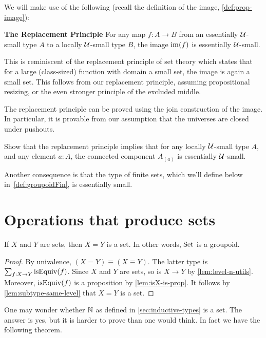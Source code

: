We will make use of the following (recall the definition of the image, \cref{def:prop-image}):
\begin{principle}[Replacement]
  \label{pri:replacement}
  {\bf The Replacement Principle} 
  For any map $f : A \to B$
  from an essentially ${\mathcal{U}}$-small type $A$
  to a locally ${\mathcal{U}}$-small type $B$,
  the image $\im(f)$ is essentially ${\mathcal{U}}$-small.
\end{principle}
This is reminiscent of the replacement principle of set theory which states
that for a large (class-sized) function with domain a small set,
the image is again a small set.
This follows from our replacement principle,
assuming propositional resizing, or the even stronger principle of the excluded middle.

The replacement principle can be proved using the join construction of the image\cite{Rijke-Join}.
In particular, it is provable from our assumption that the universes
are closed under pushouts.
\begin{xca}\label{xca:comp-loc-small-ess-small}
  Show that the replacement principle implies that for any locally ${\mathcal{U}}$-small type $A$,
  and any element $a:A$,
  the connected component $A_{(a)}$ is essentially ${\mathcal{U}}$-small.
\end{xca}
Another consequence is that the type of finite sets, which we'll define below
in~\cref{def:groupoidFin}, is essentially small.

\section{Operations that produce sets}
\label{sec:operations-on-sets}

\begin{lemma}\label{lem:Set-is-groupoid}
If $X$ and $Y$ are sets, then $X=Y$ is a set. 
In other words, $\mathrm{Set}$ is a groupoid.
\end{lemma}

\begin{proof}
By univalence, $(X=Y) \equiv (X\equiv Y)$. The latter type is
$\sum_{f:X\to Y} \mathrm{isEquiv}(f)$. Since $X$ and $Y$ are sets,
so is $X\to Y$ by \cref{lem:level-n-utils}. Moreover,
$\mathrm{isEquiv}(f)$ is a proposition by \cref{lem:isX-is-prop}.
It follows by \cref{lem:subtype-same-level} that $X=Y$ is a set.  
\end{proof}

One may wonder whether $\mathbb{N}$ as defined in \cref{sec:inductive-types}
is a set. The answer is yes, but it is harder to prove than one
would think. In fact we have the following theorem.


